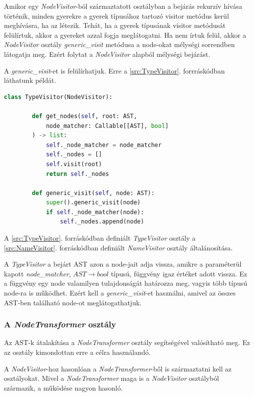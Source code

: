 Amikor egy \emph{NodeVisitor}-ból származtatott osztályban a bejárás rekurzív hívása történik,
minden gyerekre a gyerek típusához tartozó visitor metódus kerül meghívásra, ha az létezik.
Tehát, ha a gyerek típusának visitor metódusát felülírtuk, akkor a gyereket azzal fogja meglátogatni.
Ha nem írtuk felül, akkor a \emph{NodeVisitor} osztály
\emph{generic\_visit} metódusa a node-okat mélységi sorrendben látogatja meg.
Ezért folytat a \emph{NodeVisitor} alapból mélységi bejárást.

A \emph{generic\_visit}-et is felülírhatjuk.
Erre a \ref{src:TypeVisitor}. forrráskódban láthatunk példát.

\begin{lstlisting}[language={Python}]
	class TypeVisitor(NodeVisitor):
		
		def get_nodes(self, root: AST,
			node_matcher: Callable[[AST], bool]
		) -> list:
			self._node_matcher = node_matcher
			self._nodes = []
			self.visit(root)
			return self._nodes
		
		def generic_visit(self, node: AST):
			super().generic_visit(node)
			if self._node_matcher(node):
				self._nodes.append(node)
\end{lstlisting}


A \ref{src:TypeVisitor}. forráskódban definiált \emph{TypeVisitor} osztály
a \ref{src:NameVisitor}. forráskódban definiált \emph{NameVisitor} osztály
általánosítása.

A \emph{TypeVisitor} a bejárt AST azon a node-jait adja vissza,
amikre a paraméterül kapott \emph{node\_matcher}, $AST \rightarrow bool$ típusú,
függvény igaz értéket adott vissza.
Ez a függvény egy node valamilyen tulajdonságát határozza meg,
vagyis több típusú node-ra is működhet.
Ezért kell a \emph{generic\_visit}-et használni,
amivel az összes AST-ben található node-ot meglátogathatjuk.

\subsubsection{A \emph{NodeTransformer} osztály}

Az AST-k átalakítása a \emph{NodeTransformer} osztály segítségével valósítható meg.
Ez az osztály kimondottan erre a célra használandó.

A \emph{NodeVisitor}-hoz hasonlóan a \emph{NodeTransformer}-ből is származtatni
kell az osztályokat.
Mivel a \emph{NodeTransformer} maga is a \emph{NodeVisitor} osztályból származik,
a működése nagyon hasonló.

